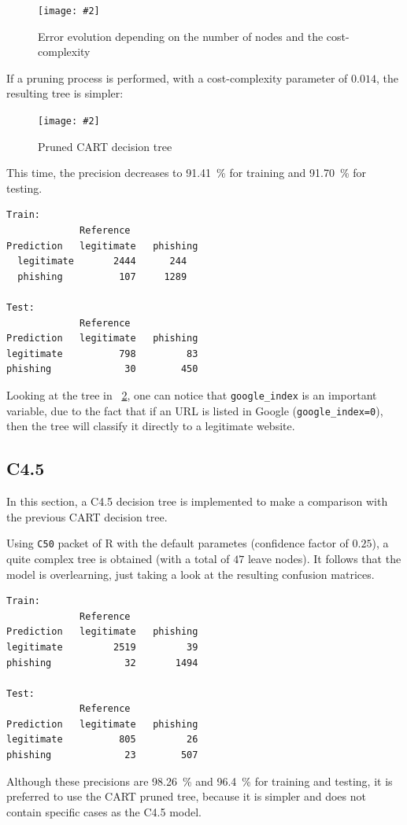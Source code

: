 \documentclass[12pt, a4paper]{article}
\newcommand*{\figref}[1]{\figurename~\ref{fig:#1}}
\newcommand{\figcaption}[4][H]{
  \begin{figure}[#1]
    \centering
    \texttt{[image: \#2]}
    \caption{#3}
    \label{fig:#2}
  \end{figure}
}
\begin{document}
      \figcaption{cart_cp.png}{Error evolution depending on the number of nodes and the cost-complexity}{1}

      If a pruning process is performed, with a cost-complexity parameter of $0.014$, the resulting tree is simpler:

      \figcaption{cart_pruned.png}{Pruned CART decision tree}{1}

      This time, the precision decreases to \SI{91.41}{\percent} for training and \SI{91.70}{\percent} for testing.

      \begin{verbatim}
Train:
             Reference
Prediction   legitimate   phishing
  legitimate       2444      244
  phishing          107     1289

Test:
             Reference
Prediction   legitimate   phishing
legitimate          798         83
phishing             30        450
      \end{verbatim}

      Looking at the tree in \figref{cart_pruned.png}, one can notice that \texttt{google\_index} is an important variable, due to the fact that if an URL is listed in Google (\texttt{google\_index=0}), then the tree will classify it directly to a legitimate website.

    \subsection{C4.5}

      In this section, a C4.5 decision tree is implemented to make a comparison with the previous CART decision tree.

      Using \texttt{C50} packet of R with the default parametes (confidence factor of $0.25$), a quite complex tree is obtained (with a total of $47$ leave nodes). It follows that the model is overlearning, just taking a look at the resulting confusion matrices.

      \begin{verbatim}
Train:
             Reference
Prediction   legitimate   phishing
legitimate         2519         39
phishing             32       1494

Test:
             Reference
Prediction   legitimate   phishing
legitimate          805         26
phishing             23        507
      \end{verbatim}

      Although these precisions are \SI{98.26}{\percent} and \SI{96.4}{\percent} for training and testing, it is preferred to use the CART pruned tree, because it is simpler and does not contain specific cases as the C4.5 model.
\end{document}
